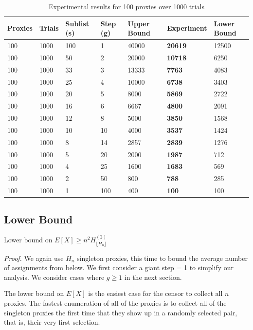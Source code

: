 \begin{table}[t]
\begin{tabular}{l|l|l|l|l|l|l}
             Proxies & Trials & Sublist (s) & Step (g) & Upper Bound & Experiment & Lower Bound  \\
\hline
\hline
100 & 1000 & 100 & 1 & 40000 & \textbf{20619} & 12500 \\\hline
100 & 1000 & 50 & 2 & 20000 & \textbf{10718}	& 6250 \\\hline
100 & 1000 & 33 & 3 & 13333	& \textbf{7763} & 4083 \\\hline
100 & 1000 & 25 & 4 & 10000 & \textbf{6738} & 3403 \\\hline
100 & 1000 & 20 & 5 & 8000 & \textbf{5869} & 2722\\\hline
100 & 1000 & 16 & 6 & 6667 & \textbf{4800} & 2091 \\\hline
100 & 1000 & 12 & 8 & 5000 & \textbf{3850} & 1568\\\hline
100 & 1000 & 10 & 10 & 4000	& \textbf{3537} & 1424\\\hline
100 & 1000 & 8 & 14 & 2857 & \textbf{2839} & 1276\\\hline
100 & 1000 & 5 & 20 & 2000 & \textbf{1987} & 712\\\hline
100 & 1000 & 4 & 25 & 1600 & \textbf{1683} & 569\\\hline
100 & 1000 & 2 & 50 & 800 & \textbf{788} & 285\\\hline
100 & 1000 & 1 & 100 & 400 & \textbf{100} & 100\\\hline

\end{tabular}
\caption{Experimental results for 100 proxies over 1000 trials\label{tab:enumn100} }
\end{table}

\subsection{Lower Bound}

\label{theorem:LBEX}
\begin{theorem} {Lower bound on $E[X] \geq n^2H^{(2)}_{\lfloor{H_n}\rfloor}$}
\end{theorem}

\emph{Proof.} We again use $H_n$ singleton proxies, this time to bound the average number of assignments from below. We first consider a giant step = 1 to simplify our analysis. We consider cases where $g\geq1$ in the next section. 

The lower bound on $E[X]$ is the easiest case for the censor to collect all $n$ proxies. The fastest enumeration of all of the proxies is to collect all of the singleton proxies the first time that they show up in a randomly selected pair, that is, their very first selection. 

